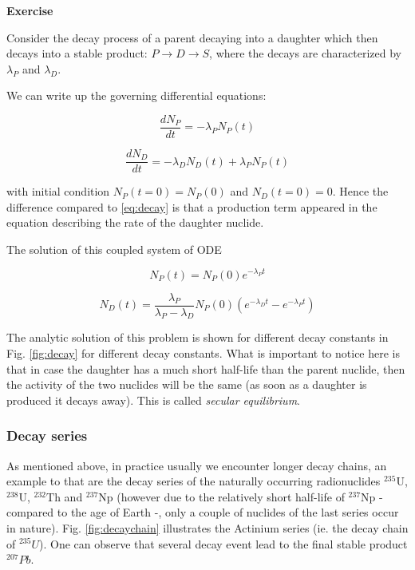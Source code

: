 \begin{tcolorbox}
\textbf{Exercise}

Consider the decay process of a parent decaying into a daughter which then decays into a stable product: $P\rightarrow D \rightarrow S$, where the decays are characterized by $\lambda_P$ and $\lambda_D$.

We can write up the governing differential equations:

$$\frac{dN_P}{dt}=-\lambda_P N_P(t)$$

$$\frac{dN_D}{dt}=-\lambda_D N_D(t) + \lambda_P N_P(t)$$

\noindent with initial condition $N_P(t=0)=N_P(0)$ and $N_D(t=0)=0$. Hence the difference compared to \eqref{eq:decay} is that a production term appeared in the equation describing the rate of the daughter nuclide.

The solution of this coupled system of ODE

$$ N_{P} (t) = N_P(0)e^{-\lambda_{P}t}$$

$$ N_{D} (t) = \frac{\lambda_P}{\lambda_P - \lambda_{D}}N_P(0)(e^{-\lambda_{D}t} - e^{-\lambda_{P}t}) $$

The analytic solution of this problem is shown for different decay constants in Fig. \ref{fig:decay} for different decay constants. What is important to notice here is that in case the daughter has a much short half-life than the parent nuclide, then the activity of the two nuclides will be the same (as soon as a daughter is produced it decays away). This is called \textit{secular equilibrium}.
\end{tcolorbox}

\subsubsection*{Decay series}

As mentioned above, in practice usually we encounter longer decay chains, an example to that are the decay series of the naturally occurring radionuclides ${}^{235}\text{U}$, ${}^{238}\text{U}$, ${}^{232}\text{Th}$ and ${}^{237}\text{Np}$ (however due to the relatively short half-life of ${}^{237}\text{Np}$ - compared to the age of Earth -, only a couple of nuclides of the last series occur in nature). Fig. \ref{fig:decaychain} illustrates the Actinium series (ie. the decay chain of ${}^{235}U$). One can observe that several decay event lead to the final stable product ${}^{207}Pb$.


